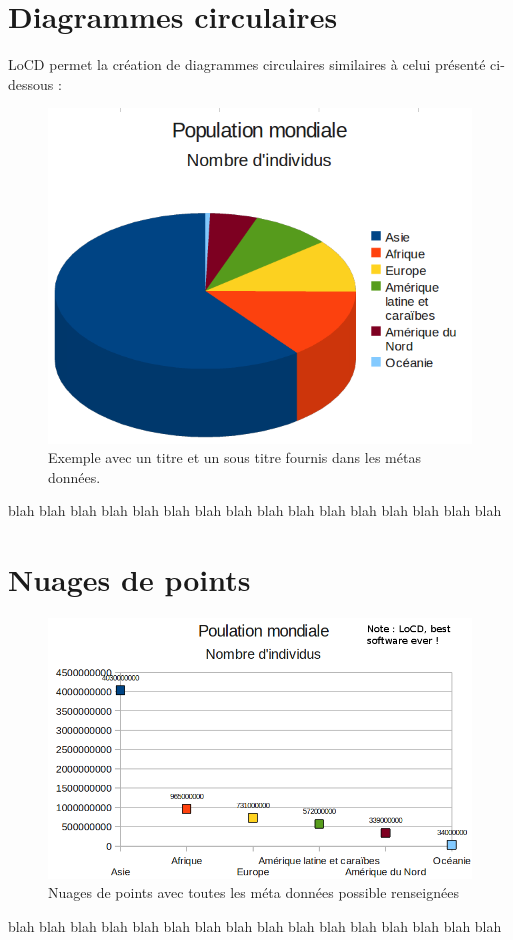 \section{Diagrammes circulaires}
LoCD permet la création de diagrammes circulaires similaires  à celui présenté ci-dessous : 
\begin{figure}[htbp]
\centering
  \includegraphics[scale=0.40]{img/diagrammecirculaire}
  \caption{Exemple avec un titre et un sous titre fournis dans les métas données.}
  \label{fig:dcirculaire}
\end{figure}
 blah  blah  blah  blah  blah  blah  blah  blah  blah  blah  blah  blah  blah  blah  blah  blah 
\clearpage
\section{Nuages de points}
\begin{figure}[htbp]
\centering
  \includegraphics[scale=0.40]{img/diagrammenuages}
  \caption{Nuages de points avec toutes les méta données possible renseignées}
  \label{fig:dnuages}
\end{figure}  
  blah  blah  blah  blah  blah  blah  blah  blah  blah  blah  blah  blah  blah  blah  blah  blah 
  
